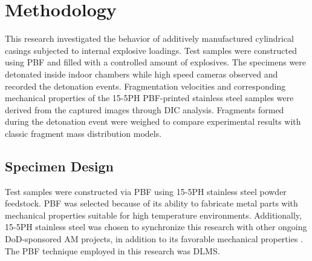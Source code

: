 \chapter{Methodology} \label{chap:3}

This research investigated the behavior of additively manufactured cylindrical casings subjected to internal explosive loadings. Test samples were constructed using \gls{PBF} and filled with a controlled amount of explosives. The specimens were detonated inside indoor chambers while high speed cameras observed and recorded the detonation events. Fragmentation velocities and corresponding mechanical properties of the 15-5PH \gls{PBF}-printed stainless steel samples were derived from the captured images through \gls{DIC} analysis. Fragments formed during the detonation event were weighed to compare experimental results with classic fragment mass distribution models.


\section{Specimen Design} \label{sec:3_specimen}



Test samples were constructed via \gls{PBF} using 15-5PH stainless steel powder feedstock. \gls{PBF} was selected because of its ability to fabricate metal parts with mechanical properties suitable for high temperature environments. Additionally, 15-5PH stainless steel was chosen to synchronize this research with other ongoing \gls{DoD}-sponsored \gls{AM} projects, in addition to its favorable mechanical properties \cite{AFIT_Dempsey, EOS_StainlessSteel_M290}. The \gls{PBF} technique employed in this research was \gls{DLMS}.

